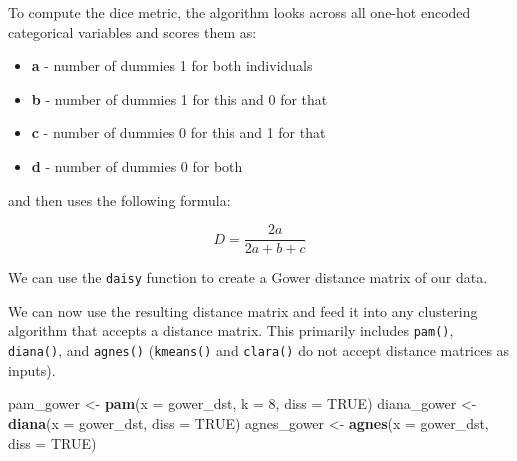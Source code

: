 \documentclass[]{book}
\newenvironment{Shaded}{\begin{snugshade}}{\end{snugshade}}
\newcommand{\CommentTok}[1]{\textcolor[rgb]{0.56,0.35,0.01}{\textit{#1}}}
\newcommand{\DataTypeTok}[1]{\textcolor[rgb]{0.13,0.29,0.53}{#1}}
\newcommand{\DecValTok}[1]{\textcolor[rgb]{0.00,0.00,0.81}{#1}}
\newcommand{\KeywordTok}[1]{\textcolor[rgb]{0.13,0.29,0.53}{\textbf{#1}}}
\newcommand{\NormalTok}[1]{#1}
\newcommand{\OperatorTok}[1]{\textcolor[rgb]{0.81,0.36,0.00}{\textbf{#1}}}
\newcommand{\OtherTok}[1]{\textcolor[rgb]{0.56,0.35,0.01}{#1}}
\newcommand{\StringTok}[1]{\textcolor[rgb]{0.31,0.60,0.02}{#1}}
\providecommand{\tightlist}{%
  \setlength{\itemsep}{0pt}\setlength{\parskip}{0pt}}
\theoremstyle{definition}
\theoremstyle{definition}
\theoremstyle{definition}
\theoremstyle{remark}
\begin{document}
To compute the dice metric, the algorithm looks across all one-hot
encoded categorical variables and scores them as:

\begin{itemize}
\tightlist
\item
  \textbf{a} - number of dummies 1 for both individuals
\item
  \textbf{b} - number of dummies 1 for this and 0 for that
\item
  \textbf{c} - number of dummies 0 for this and 1 for that
\item
  \textbf{d} - number of dummies 0 for both
\end{itemize}

and then uses the following formula:

\[ D = \frac{2a}{2a + b + c}  \]

We can use the \texttt{daisy} function to create a Gower distance matrix
of our data.

\begin{Shaded}
\end{Shaded}

We can now use the resulting distance matrix and feed it into any
clustering algorithm that accepts a distance matrix. This primarily
includes \texttt{pam()}, \texttt{diana()}, and \texttt{agnes()}
(\texttt{kmeans()} and \texttt{clara()} do not accept distance matrices
as inputs).

\begin{Shaded}
\begin{Highlighting}[]
\NormalTok{pam_gower <-}\StringTok{ }\KeywordTok{pam}\NormalTok{(}\DataTypeTok{x =}\NormalTok{ gower_dst, }\DataTypeTok{k =} \DecValTok{8}\NormalTok{, }\DataTypeTok{diss =} \OtherTok{TRUE}\NormalTok{)}
\NormalTok{diana_gower <-}\StringTok{ }\KeywordTok{diana}\NormalTok{(}\DataTypeTok{x =}\NormalTok{ gower_dst, }\DataTypeTok{diss =} \OtherTok{TRUE}\NormalTok{)}
\NormalTok{agnes_gower <-}\StringTok{ }\KeywordTok{agnes}\NormalTok{(}\DataTypeTok{x =}\NormalTok{ gower_dst, }\DataTypeTok{diss =} \OtherTok{TRUE}\NormalTok{)}
\end{Highlighting}
\end{Shaded}
\end{document}
